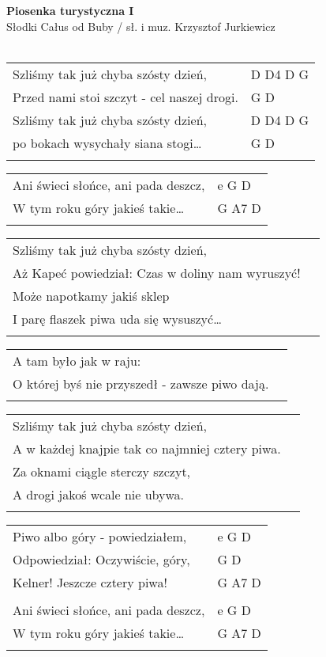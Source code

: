 \documentclass[a5paper]{article}
\begin{document}


\noindent
\fontsize{12pt}{15pt}\selectfont
\textbf{Piosenka turystyczna I} \\
\fontsize{8pt}{10pt}\selectfont
Słodki Całus od Buby / sł. i muz. Krzysztof Jurkiewicz \\ \\
\fontsize{10pt}{12pt}\selectfont
{}
\begin{tabular}{@{}p{9.00cm}p{3cm}@{}}
\noindent
Szliśmy tak już chyba szósty dzień,	& D D4 D G \\
Przed nami stoi szczyt - cel naszej drogi. & G D \\
Szliśmy tak już chyba szósty dzień, & D D4 D G \\                             
po bokach wysychały siana stogi… & G D \\ \\
\end{tabular}

\noindent
\begin{tabular}{@{}p{8.00cm}p{3cm}@{}}
Ani świeci słońce, ani pada deszcz, & e G D \\
W tym roku góry jakieś takie… & G A7 D \\ \\
\end{tabular}

\noindent
\begin{tabular}{@{}p{8.00cm}p{3cm}@{}}
Szliśmy tak już chyba szósty dzień, \\
Aż Kapeć powiedział: Czas w doliny nam wyruszyć! \\
Może napotkamy jakiś sklep \\
I parę flaszek piwa uda się wysuszyć… \\ \\
\end{tabular}

\noindent
\begin{tabular}{@{}p{8.00cm}p{3cm}@{}}
A tam było jak w raju: \\
O której byś nie przyszedł - zawsze piwo dają. \\ \\
\end{tabular}

\noindent
\begin{tabular}{@{}p{8.00cm}p{3cm}@{}}
Szliśmy tak już chyba szósty dzień, \\
A w każdej knajpie tak co najmniej cztery piwa. \\
Za oknami ciągle sterczy szczyt, \\
A drogi jakoś wcale nie ubywa. \\ \\
\end{tabular}

\noindent
\begin{tabular}{@{}p{8.00cm}p{3cm}@{}}
Piwo albo góry - powiedziałem, & e G D \\
Odpowiedział: Oczywiście, góry, & G D \\
Kelner! Jeszcze cztery piwa! & G A7 D \\ \\
Ani świeci słońce, ani pada deszcz, & e G D \\
W tym roku góry jakieś takie… & G A7 D \\ \\
\end{tabular}
\end{document}
